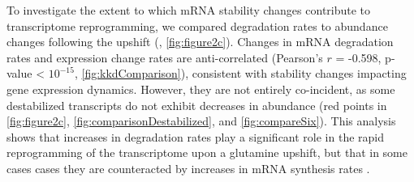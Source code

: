 To investigate the extent to which mRNA stability changes contribute
to transcriptome reprogramming, we compared degradation rates
to abundance changes following the upshift 
(\cite{airoldi2016steady}, \autoref{fig:figure2c}). 
Changes in mRNA degradation rates
and expression change rates are anti-correlated (Pearson's $r$ = -0.598,
p-value < $10^{-15}$, \autoref{fig:kkdComparison}),
consistent with stability changes impacting gene expression dynamics.
However, they are not entirely co-incident, as some destabilized
transcripts do not exhibit decreases in abundance (red points in
\autoref{fig:figure2c}, \autoref{fig:comparisonDestabilized},
and \autoref{fig:compareSix}).
This analysis shows that increases in degradation rates play a 
significant role
in the rapid reprogramming of the transcriptome upon a glutamine
upshift, but that in some cases cases they are counteracted by
increases in mRNA synthesis rates
\parencite{shalem2008transient,canadell2015impact}.

